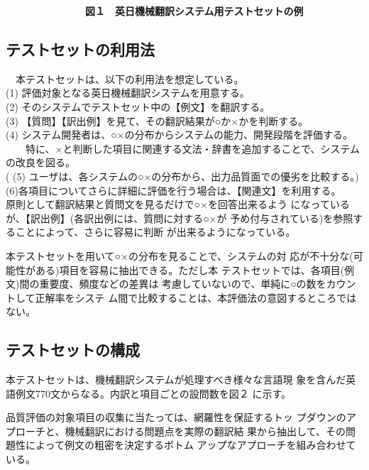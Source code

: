 {\bf　　　　　　　　図１　英日機械翻訳システム用テストセットの例}

\vspace*{1em}

\subsection{テストセットの利用法}

　本テストセットは、以下の利用法を想定している。\\

\noindent(1) 評価対象となる英日機械翻訳システムを用意する。\\
\noindent(2) そのシステムでテストセット中の【例文】を翻訳する。\\
\noindent(3) 【質問】【訳出例】を見て、その翻訳結果が○か×かを判断する。\\
\noindent(4) システム開発者は、○×の分布からシステムの能力、開発段階を評価する。\\
　　特に、×と判断した項目に関連する文法・辞書を追加することで、システムの改良を図る。\\
\noindent( (5) ユーザは、各システムの○×の分布から、出力品質面での優劣を比較する。)\\
\noindent(6)各項目についてさらに詳細に評価を行う場合は、【関連文】を利用する。\\


原則として翻訳結果と質問文を見るだけで○×を回答出来るよう
になっているが、【訳出例】(各訳出例には、質問に対する○×が
予め付与されている)を参照することによって、さらに容易に判断
が出来るようになっている。

本テストセットを用いて○×の分布を見ることで、システムの対
応が不十分な(可能性がある)項目を容易に抽出できる。ただし本
テストセットでは、各項目(例文)間の重要度、頻度などの差異は
考慮していないので、単純に○の数をカウントして正解率をシステ
ム間で比較することは、本評価法の意図するところではない。

\subsection{テストセットの構成}

本テストセットは、機械翻訳システムが処理すべき様々な言語現
象を含んだ英語例文770文からなる。内訳と項目ごとの設問数を図２
に示す。

品質評価の対象項目の収集に当たっては、網羅性を保証するトッ
プダウンのアプローチと、機械翻訳における問題点を実際の翻訳結
果から抽出して、その問題性によって例文の粗密を決定するボトム
アップなアプローチを組み合わせている。

